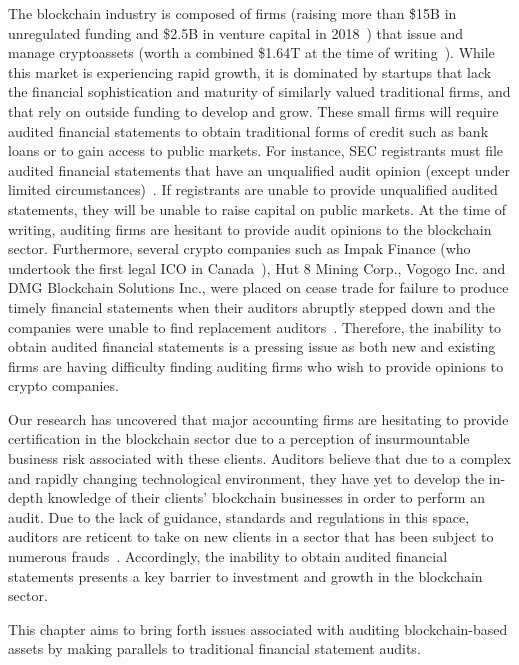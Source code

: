 The blockchain industry is composed of firms (raising more than \$15B in unregulated funding and \$2.5B in venture capital in 2018~\cite{coindesk2018}) that issue and manage cryptoassets (worth a combined \$1.64T at the time of writing~\cite{coinmarketcap}). While this market is experiencing rapid growth, it is dominated by startups that lack the financial sophistication and maturity of similarly valued traditional firms, and that rely on outside funding to develop and grow. These small firms will require audited financial statements to obtain traditional forms of credit such as bank loans or to gain access to public markets. For instance, SEC registrants must file audited financial statements that have an unqualified audit opinion (except under limited circumstances)~\cite{securities2009financial}. If registrants are unable to provide unqualified audited statements, they will be unable to raise capital on public markets. At the time of writing, auditing firms are hesitant to provide audit opinions to the blockchain sector. Furthermore, several crypto companies such as Impak Finance (who undertook the first legal ICO in Canada~\cite{AMFImpactFinance}), Hut 8 Mining Corp., Vogogo Inc. and DMG Blockchain Solutions Inc., were placed on cease trade for failure to produce timely financial statements when their auditors abruptly stepped down and the companies were unable to find replacement auditors~\cite{posadzki2019crypto}. Therefore, the inability to obtain audited financial statements is a pressing issue as both new and existing firms are having difficulty finding auditing firms who wish to provide opinions to crypto companies.

Our research has uncovered that major accounting firms are hesitating to provide certification in the blockchain sector due to a perception of insurmountable business risk associated with these clients. Auditors believe that due to a complex and rapidly changing technological environment, they have yet to develop the in-depth knowledge of their clients' blockchain businesses in order to perform an audit. Due to the lack of guidance, standards and regulations in this space, auditors are reticent to take on new clients in a sector that has been subject to numerous frauds~\cite{abreu2018blockchain}. Accordingly, the inability to obtain audited financial statements presents a key barrier to investment and growth in the blockchain sector.


This chapter aims to bring forth issues associated with auditing blockchain-based assets by making parallels to traditional financial statement audits. 


